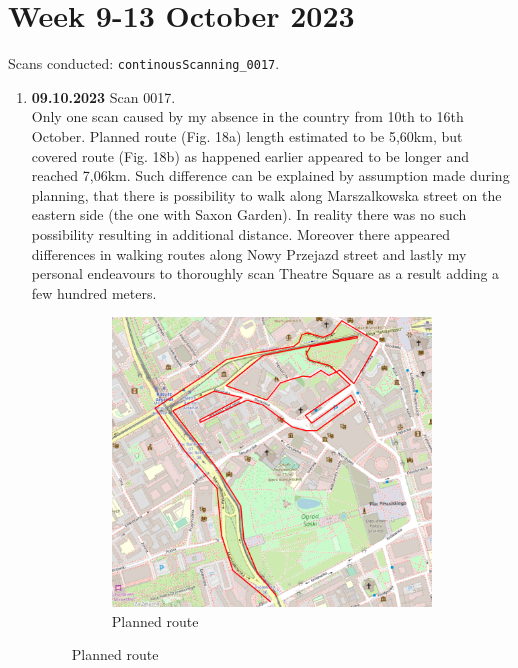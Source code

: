 \documentclass[a4paper,12pt]{article}
\begin{document}
\section{Week 9-13 October 2023}
Scans conducted: \verb|continousScanning_0017|.\\
\begin{enumerate}
	\item \textbf{09.10.2023} Scan 0017. \\
	Only one scan caused by my absence in the country from 10th to 16th October. Planned route (Fig. 18a) length estimated to be 5,60km, but covered route (Fig. 18b) as happened earlier appeared to be longer and reached 7,06km. Such difference can be explained by assumption made during planning, that there is possibility to walk along Marszalkowska street on the eastern side (the one with Saxon Garden). In reality there was no such possibility resulting in additional distance. Moreover there appeared differences in walking routes along Nowy Przejazd street and lastly my personal endeavours to thoroughly scan Theatre Square as a result adding a few hundred meters.
	\begin{figure}[H]
		\centering
		\begin{subfigure}{.75\textwidth}
			\centering
			\includegraphics[width=1\linewidth]{route_p17}
			\caption{Planned route}
			\label{fig:a17}
		\end{subfigure}%
		\linebreak

\end{figure}
\end{enumerate}
\end{document}

